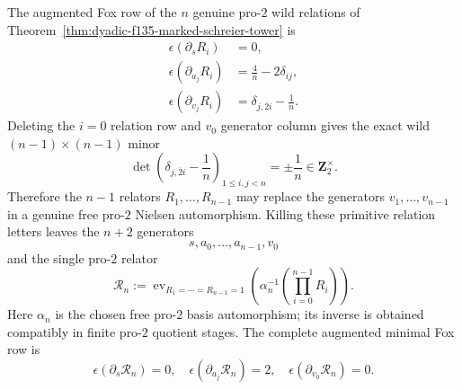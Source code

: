 \begin{theorem}
\label{thm:dyadic-f135-uniform-nielsen-demushkin}
The augmented Fox row of the
$n$ genuine pro-$2$ wild relations
of Theorem~\ref{thm:dyadic-f135-marked-schreier-tower}
is
\begin{equation}\label{eq:dyadic-f135-nwild-augmented-fox}
\boxed{
\begin{aligned}
\epsilon(\partial_sR_i)&=0,\\
\epsilon(\partial_{a_j}R_i)&=\frac4n-2\delta_{ij},\\
\epsilon(\partial_{v_j}R_i)
&=\delta_{j,\overline2 i}-\frac1n.
\end{aligned}}
\end{equation}
Deleting the $i=0$ relation row
and $v_0$ generator column gives
the exact wild $(n-1)\times(n-1)$
minor
\begin{equation}\label{eq:dyadic-f135-wild-n-minus1-minor}
\boxed{\qquad
\det\left(
\delta_{j,\overline2 i}-\frac1n
\right)_{1\le i,j<n}
=\pm\frac1n
\in\mathbf Z_2^\times.
\qquad}
\end{equation}
Therefore the $n-1$ relators
$R_1,\ldots,R_{n-1}$
may replace the generators
$v_1,\ldots,v_{n-1}$
in a genuine free pro-$2$
Nielsen automorphism.
Killing these primitive
relation letters leaves
the $n+2$ generators
\[
s,a_0,\ldots,a_{n-1},v_0
\]
and the single pro-$2$ relator
\begin{equation}\label{eq:dyadic-f135-uniform-one-relator}
\boxed{
\mathscr R_n:=
\operatorname{ev}_{R_1=\cdots=R_{n-1}=1}
\left(\alpha_n^{-1}
\left(\prod_{i=0}^{n-1}R_i\right)\right).
}
\end{equation}
Here $\alpha_n$ is the chosen
free pro-$2$ basis automorphism;
its inverse is obtained
compatibly in finite
pro-$2$ quotient stages.
The complete augmented
minimal Fox row is
\begin{equation}\label{eq:dyadic-f135-uniform-minimal-first-row}
\boxed{\qquad
\epsilon(\partial_s\mathscr R_n)=0,
\quad
\epsilon(\partial_{a_j}\mathscr R_n)=2,
\quad
\epsilon(\partial_{v_0}\mathscr R_n)=0.
\qquad}
\end{equation}


\end{theorem}
